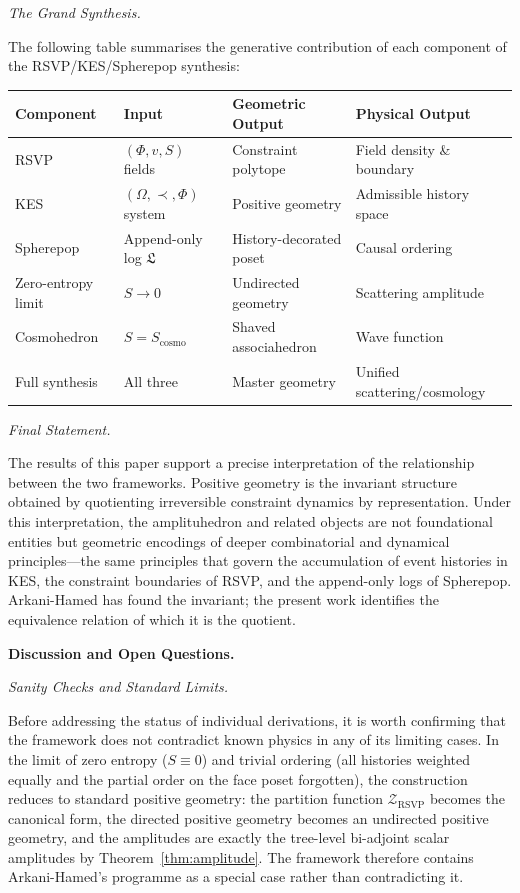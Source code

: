 \documentclass[11pt]{article}
\theoremstyle{plain}
\theoremstyle{definition}
\theoremstyle{remark}
\newcommand{\Phif}{\Phi}
\newcommand{\vf}{v}
\newcommand{\Sf}{S}
\newcommand{\OmKS}{\Omega}
\newcommand{\Log}{\mathfrak{L}}
\newcommand{\ZRSVP}{\mathcal{Z}_{\mathrm{RSVP}}}
\begin{document}
\medskip\noindent\textit{The Grand Synthesis.}

The following table summarises the generative contribution of each component of the RSVP/KES/Spherepop synthesis:

\begin{center}
\begin{tabular}{llll}
\toprule
Component & Input & Geometric Output & Physical Output \\
\midrule
RSVP & $(\Phif, \vf, \Sf)$ fields & Constraint polytope & Field density \& boundary \\
KES & $(\OmKS, \prec, \Phif)$ system & Positive geometry & Admissible history space \\
Spherepop & Append-only log $\Log$ & History-decorated poset & Causal ordering \\
Zero-entropy limit & $\Sf \to 0$ & Undirected geometry & Scattering amplitude \\
Cosmohedron & $\Sf = \Sf_{\mathrm{cosmo}}$ & Shaved associahedron & Wave function \\
Full synthesis & All three & Master geometry & Unified scattering/cosmology \\
\bottomrule
\end{tabular}
\end{center}

\medskip\noindent\textit{Final Statement.}

The results of this paper support a precise interpretation of the relationship between the two frameworks. Positive geometry is the invariant structure obtained by quotienting irreversible constraint dynamics by representation. Under this interpretation, the amplituhedron and related objects are not foundational entities but geometric encodings of deeper combinatorial and dynamical principles---the same principles that govern the accumulation of event histories in KES, the constraint boundaries of RSVP, and the append-only logs of Spherepop. Arkani-Hamed has found the invariant; the present work identifies the equivalence relation of which it is the quotient.

\bigskip\noindent\textbf{Discussion and Open Questions.}
\label{sec:discussion}

\medskip\noindent\textit{Sanity Checks and Standard Limits.}

Before addressing the status of individual derivations, it is worth confirming that the framework does not contradict known physics in any of its limiting cases. In the limit of zero entropy ($\Sf \equiv 0$) and trivial ordering (all histories weighted equally and the partial order on the face poset forgotten), the construction reduces to standard positive geometry: the partition function $\ZRSVP$ becomes the canonical form, the directed positive geometry becomes an undirected positive geometry, and the amplitudes are exactly the tree-level bi-adjoint scalar amplitudes by Theorem~\ref{thm:amplitude}. The framework therefore contains Arkani-Hamed's programme as a special case rather than contradicting it.
\end{document}
